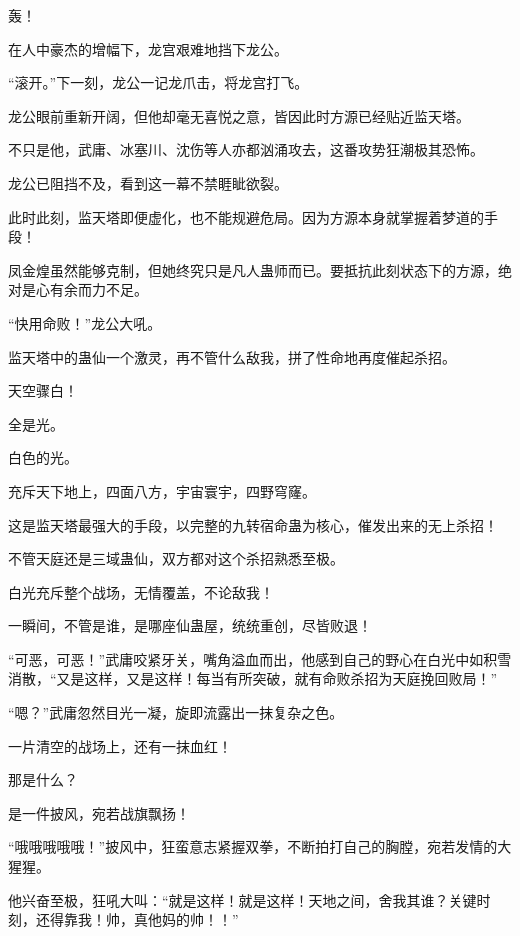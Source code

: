 
\begin{this_body}



轰！

在人中豪杰的增幅下，龙宫艰难地挡下龙公。

“滚开。”下一刻，龙公一记龙爪击，将龙宫打飞。

龙公眼前重新开阔，但他却毫无喜悦之意，皆因此时方源已经贴近监天塔。

不只是他，武庸、冰塞川、沈伤等人亦都汹涌攻去，这番攻势狂潮极其恐怖。

龙公已阻挡不及，看到这一幕不禁睚眦欲裂。

此时此刻，监天塔即便虚化，也不能规避危局。因为方源本身就掌握着梦道的手段！

凤金煌虽然能够克制，但她终究只是凡人蛊师而已。要抵抗此刻状态下的方源，绝对是心有余而力不足。

“快用命败！”龙公大吼。

监天塔中的蛊仙一个激灵，再不管什么敌我，拼了性命地再度催起杀招。

天空骤白！

全是光。

白色的光。

充斥天下地上，四面八方，宇宙寰宇，四野穹窿。

这是监天塔最强大的手段，以完整的九转宿命蛊为核心，催发出来的无上杀招！

不管天庭还是三域蛊仙，双方都对这个杀招熟悉至极。

白光充斥整个战场，无情覆盖，不论敌我！

一瞬间，不管是谁，是哪座仙蛊屋，统统重创，尽皆败退！

“可恶，可恶！”武庸咬紧牙关，嘴角溢血而出，他感到自己的野心在白光中如积雪消散，“又是这样，又是这样！每当有所突破，就有命败杀招为天庭挽回败局！”

“嗯？”武庸忽然目光一凝，旋即流露出一抹复杂之色。

一片清空的战场上，还有一抹血红！

那是什么？

是一件披风，宛若战旗飘扬！

“哦哦哦哦哦！”披风中，狂蛮意志紧握双拳，不断拍打自己的胸膛，宛若发情的大猩猩。

他兴奋至极，狂吼大叫：“就是这样！就是这样！天地之间，舍我其谁？关键时刻，还得靠我！帅，真他妈的帅！！”


\end{this_body}
